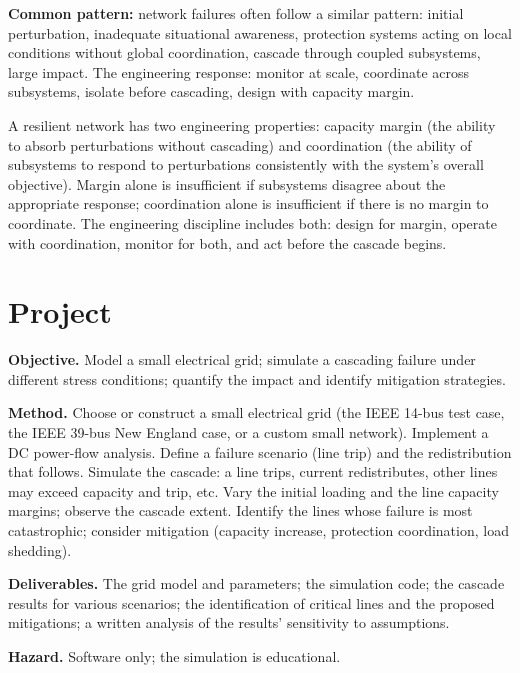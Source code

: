 \textbf{Common pattern:} network failures often follow a similar pattern: initial perturbation, inadequate situational awareness, protection systems acting on local conditions without global coordination, cascade through coupled subsystems, large impact. The engineering response: monitor at scale, coordinate across subsystems, isolate before cascading, design with capacity margin.

\begin{principle}
A resilient network has two engineering properties: capacity margin (the ability to absorb perturbations without cascading) and coordination (the ability of subsystems to respond to perturbations consistently with the system's overall objective). Margin alone is insufficient if subsystems disagree about the appropriate response; coordination alone is insufficient if there is no margin to coordinate. The engineering discipline includes both: design for margin, operate with coordination, monitor for both, and act before the cascade begins.
\end{principle}

\section{Project}

\begin{project}
\textbf{Objective.} Model a small electrical grid; simulate a cascading failure under different stress conditions; quantify the impact and identify mitigation strategies.

\textbf{Method.} Choose or construct a small electrical grid (the IEEE 14-bus test case, the IEEE 39-bus New England case, or a custom small network). Implement a DC power-flow analysis. Define a failure scenario (line trip) and the redistribution that follows. Simulate the cascade: a line trips, current redistributes, other lines may exceed capacity and trip, etc. Vary the initial loading and the line capacity margins; observe the cascade extent. Identify the lines whose failure is most catastrophic; consider mitigation (capacity increase, protection coordination, load shedding).

\textbf{Deliverables.} The grid model and parameters; the simulation code; the cascade results for various scenarios; the identification of critical lines and the proposed mitigations; a written analysis of the results' sensitivity to assumptions.

\textbf{Hazard.} Software only; the simulation is educational.
\end{project}

